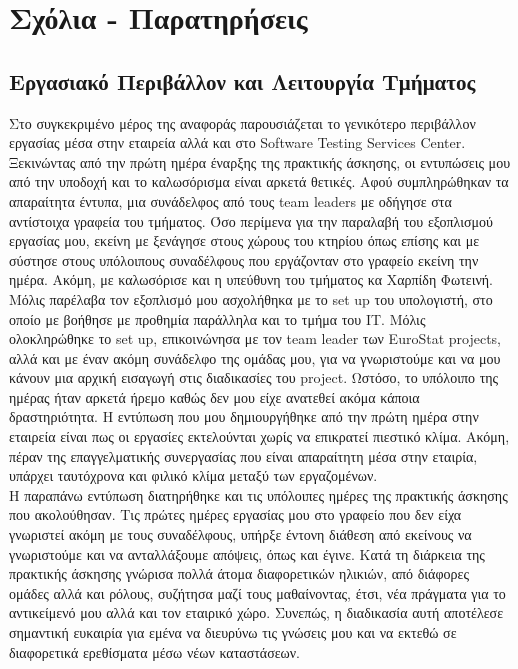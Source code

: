\chapter*{Σχόλια - Παρατηρήσεις}

\section{Εργασιακό Περιβάλλον και Λειτουργία Τμήματος}
Στο συγκεκριμένο μέρος της αναφοράς παρουσιάζεται το γενικότερο περιβάλλον εργασίας μέσα στην εταιρεία αλλά και στο Software Testing 
Services Center. Ξεκινώντας από την πρώτη ημέρα έναρξης της πρακτικής άσκησης, οι εντυπώσεις μου από την υποδοχή και το καλωσόρισμα είναι 
αρκετά θετικές. Αφού συμπληρώθηκαν τα απαραίτητα έντυπα, μια συνάδελφος από τους team leaders με οδήγησε στα αντίστοιχα γραφεία του τμήματος. 
Όσο περίμενα για την παραλαβή του εξοπλισμού εργασίας μου, εκείνη με ξενάγησε στους χώρους του κτηρίου όπως επίσης και με σύστησε στους υπόλοιπους 
συναδέλφους που εργάζονταν στο γραφείο εκείνη την ημέρα. Ακόμη, με καλωσόρισε και η υπεύθυνη του τμήματος κα Χαρπίδη Φωτεινή. 
Μόλις παρέλαβα τον εξοπλισμό μου ασχολήθηκα με το set up του υπολογιστή, στο οποίο με βοήθησε 
με προθημία παράλληλα και το τμήμα του ΙΤ. Μόλις ολοκληρώθηκε το set up, επικοινώνησα με τον team leader των EuroStat projects, αλλά και με έναν 
ακόμη συνάδελφο της ομάδας μου, για να γνωριστούμε και να μου κάνουν μια αρχική εισαγωγή στις διαδικασίες του project. Ωστόσο, το υπόλοιπο της ημέρας ήταν αρκετά ήρεμο 
καθώς δεν μου είχε ανατεθεί ακόμα κάποια δραστηριότητα. Η εντύπωση που μου δημιουργήθηκε από την πρώτη ημέρα στην εταιρεία είναι πως οι εργασίες εκτελούνται χωρίς να επικρατεί 
πιεστικό κλίμα. Ακόμη, πέραν της επαγγελματικής συνεργασίας που είναι απαραίτητη μέσα στην εταιρία, υπάρχει ταυτόχρονα και φιλικό κλίμα μεταξύ των εργαζομένων.\\

Η παραπάνω εντύπωση διατηρήθηκε και τις υπόλοιπες ημέρες της πρακτικής άσκησης που ακολούθησαν. Τις πρώτες ημέρες εργασίας μου στο γραφείο που δεν είχα γνωριστεί ακόμη με τους συναδέλφους, 
υπήρξε έντονη διάθεση από εκείνους να γνωριστούμε και να ανταλλάξουμε απόψεις, όπως και έγινε. Κατά τη διάρκεια της πρακτικής άσκησης γνώρισα πολλά άτομα διαφορετικών ηλικιών, από διάφορες ομάδες αλλά και ρόλους, 
συζήτησα μαζί τους μαθαίνοντας, έτσι, νέα πράγματα για το αντικείμενό μου αλλά και τον εταιρικό χώρο. Συνεπώς, η διαδικασία αυτή αποτέλεσε σημαντική ευκαιρία για εμένα να διευρύνω τις γνώσεις μου και 
να εκτεθώ σε διαφορετικά ερεθίσματα μέσω νέων καταστάσεων.\\

